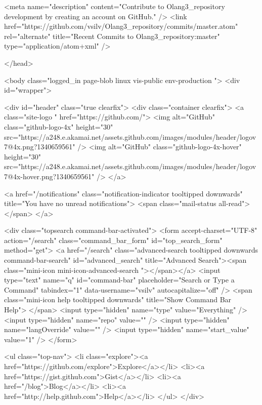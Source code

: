     <meta name="description" content="Contribute to Olang3_repository development by creating an account on GitHub." />
  <link href="https://github.com/vsilv/Olang3_repository/commits/master.atom" rel="alternate" title="Recent Commits to Olang3_repository:master" type="application/atom+xml" />

  </head>


  <body class="logged_in page-blob linux vis-public env-production ">
    <div id="wrapper">

    
    

    

      <div id="header" class="true clearfix">
        <div class="container clearfix">
          <a class="site-logo " href="https://github.com/">
            <img alt="GitHub" class="github-logo-4x" height="30" src="https://a248.e.akamai.net/assets.github.com/images/modules/header/logov7@4x.png?1340659561" />
            <img alt="GitHub" class="github-logo-4x-hover" height="30" src="https://a248.e.akamai.net/assets.github.com/images/modules/header/logov7@4x-hover.png?1340659561" />
          </a>

            <a href="/notifications" class="notification-indicator tooltipped downwards" title="You have no unread notifications">
              <span class="mail-status all-read"></span>
            </a>

              
    <div class="topsearch command-bar-activated">
      <form accept-charset="UTF-8" action="/search" class="command_bar_form" id="top_search_form" method="get">
  <a href="/search" class="advanced-search tooltipped downwards command-bar-search" id="advanced_search" title="Advanced Search"><span class="mini-icon mini-icon-advanced-search "></span></a>
  <input type="text" name="q" id="command-bar" placeholder="Search or Type a Command" tabindex="1" data-username="vsilv" autocapitalize="off" />
  <span class="mini-icon help tooltipped downwards" title="Show Command Bar Help"></span>
  <input type="hidden" name="type" value="Everything" />
  <input type="hidden" name="repo" value="" />
  <input type="hidden" name="langOverride" value="" />
  <input type="hidden" name="start_value" value="1" />
</form>

      <ul class="top-nav">
          <li class="explore"><a href="https://github.com/explore">Explore</a></li>
          <li><a href="https://gist.github.com">Gist</a></li>
          <li><a href="/blog">Blog</a></li>
        <li><a href="http://help.github.com">Help</a></li>
      </ul>
    </div>


